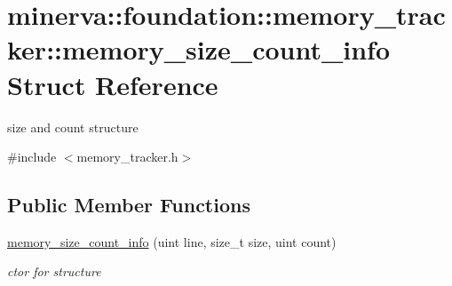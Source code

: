 \hypertarget{structminerva_1_1foundation_1_1memory__tracker_1_1memory__size__count__info}{}\section{minerva\+:\+:foundation\+:\+:memory\+\_\+tracker\+:\+:memory\+\_\+size\+\_\+count\+\_\+info Struct Reference}
\label{structminerva_1_1foundation_1_1memory__tracker_1_1memory__size__count__info}


size and count structure  




{\ttfamily \#include $<$memory\+\_\+tracker.\+h$>$}

\subsection*{Public Member Functions}
\begin{DoxyCompactItemize}
\item 
\mbox{\label{structminerva_1_1foundation_1_1memory__tracker_1_1memory__size__count__info_ab2a5feb1a5c4f7f22c41963e36f6c887}} 
\hyperlink{structminerva_1_1foundation_1_1memory__tracker_1_1memory__size__count__info_ab2a5feb1a5c4f7f22c41963e36f6c887}{memory\+\_\+size\+\_\+count\+\_\+info} (uint line, size\+\_\+t size, uint count)
\begin{DoxyCompactList}\small\item\em ctor for structure \end{DoxyCompactList}\end{DoxyCompactItemize}
